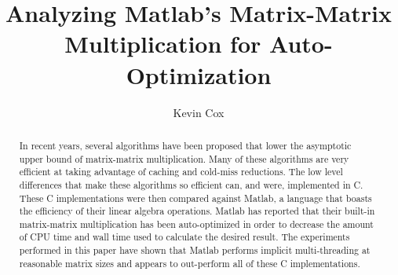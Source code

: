 \documentclass[sigconf]{acmart}
\begin{document}
%
\title{Analyzing Matlab's Matrix-Matrix Multiplication for Auto-Optimization}

%
\author{Kevin Cox}
\orcid{}

%

%
\begin{abstract}

In recent years, several algorithms have been proposed that lower the asymptotic upper bound of matrix-matrix multiplication. Many of these algorithms are very efficient at taking advantage of caching and cold-miss reductions. The low level differences that make these algorithms so efficient can, and were, implemented in C. These C implementations were then compared against Matlab, a language that boasts the efficiency of their linear algebra operations. Matlab has reported that their built-in matrix-matrix multiplication has been auto-optimized in order to decrease the amount of CPU time and wall time used to calculate the desired result. The experiments performed in this paper have shown that Matlab performs implicit multi-threading at reasonable matrix sizes and appears to out-perform all of these C implementations.

\end{abstract}

%
\end{document}
